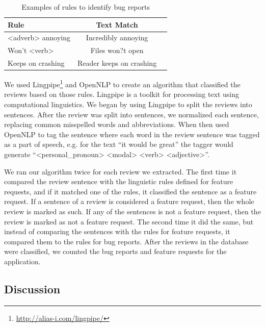 \documentclass{sig-alternate}
\begin{document}
\begin{table}[h]
\begin{center}
\caption{Examples of rules to identify bug reports}
\label{Table:Rule2}
  \begin{tabular}{ | l | c | c |  } \hline

     \bfseries Rule  & \bfseries Text Match \\ \hline
 	
	<adverb> annoying & Incredibly annoying \\ \hline
	Won't <verb> & Files won?t open \\ \hline
	Keeps on crashing & Reader keeps on crashing \\ \hline

  \end{tabular}
  \end{center}
\end{table}


We used Lingpipe\footnote{\url{http://alias-i.com/lingpipe/}} and OpenNLP to create an algorithm that classified the reviews based on those rules. Lingpipe is a toolkit for processing text using computational linguistics. We began by using Lingpipe to split the reviews into sentences. After the review was split into sentences, we normalized each sentence, replacing common misspelled words and abbreviations. When then used OpenNLP to tag the sentence where each word in the review sentence was tagged as a part of speech, e.g. for the text ``it would be great'' the tagger would generate ``<personal\_pronoun> <modal> <verb> <adjective>''.

We ran our algorithm twice for each review we extracted. The first time it compared the review sentence with the linguistic rules defined for feature requests, and if it matched one of the rules, it classified the sentence as a feature request. If a sentence of a review is considered a feature request, then the whole review is marked as such. If any of the sentences is not a feature request, then the review is marked as not a feature request. The second time it did the same, but instead of comparing the sentences with the rules for feature requests, it compared them to the rules for bug reports. After the reviews in the database were classified, we counted the bug reports and feature requests for the application.




\subsection{Discussion}
\end{document}
